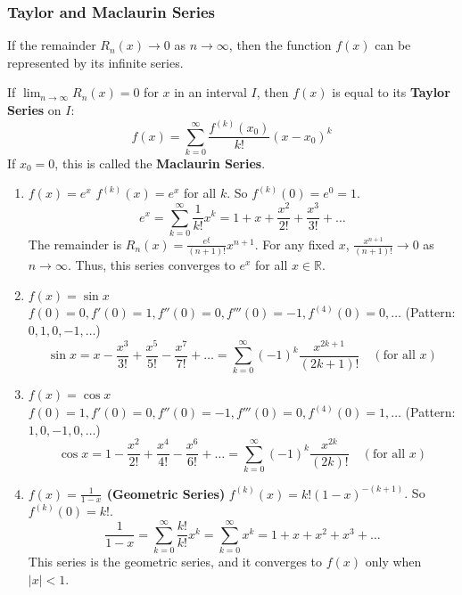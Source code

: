 \subsubsection{Taylor and Maclaurin Series}
If the remainder $R_n(x) \to 0$ as $n \to \infty$, then the function $f(x)$ can be represented by its infinite series.

\begin{definition}
If $\lim_{n \to \infty} R_n(x) = 0$ for $x$ in an interval $I$, then $f(x)$ is equal to its \textbf{Taylor Series} on $I$:
\[
f(x) = \sum_{k=0}^{\infty} \frac{f^{(k)}(x_0)}{k!} (x-x_0)^k
\]
If $x_0 = 0$, this is called the \textbf{Maclaurin Series}.
\end{definition}

\begin{example}
\begin{enumerate}
    \item \textbf{$f(x) = e^x$}
    $f^{(k)}(x) = e^x$ for all $k$. So $f^{(k)}(0) = e^0 = 1$.
    \[
    e^x = \sum_{k=0}^{\infty} \frac{1}{k!} x^k = 1 + x + \frac{x^2}{2!} + \frac{x^3}{3!} + \dots
    \]
    The remainder is $R_n(x) = \frac{e^\xi}{(n+1)!} x^{n+1}$. For any fixed $x$, $\frac{x^{n+1}}{(n+1)!} \to 0$ as $n \to \infty$. Thus, this series converges to $e^x$ for all $x \in \mathbb{R}$.

    \item \textbf{$f(x) = \sin x$}
    $f(0)=0, f'(0)=1, f''(0)=0, f'''(0)=-1, f^{(4)}(0)=0, \dots$ (Pattern: $0, 1, 0, -1, \dots$)
    \[
    \sin x = x - \frac{x^3}{3!} + \frac{x^5}{5!} - \frac{x^7}{7!} + \dots = \sum_{k=0}^{\infty} (-1)^k \frac{x^{2k+1}}{(2k+1)!} \quad (\text{for all } x)
    \]

    \item \textbf{$f(x) = \cos x$}
    $f(0)=1, f'(0)=0, f''(0)=-1, f'''(0)=0, f^{(4)}(0)=1, \dots$ (Pattern: $1, 0, -1, 0, \dots$)
    \[
    \cos x = 1 - \frac{x^2}{2!} + \frac{x^4}{4!} - \frac{x^6}{6!} + \dots = \sum_{k=0}^{\infty} (-1)^k \frac{x^{2k}}{(2k)!} \quad (\text{for all } x)
    \]
    
    \item \textbf{$f(x) = \frac{1}{1-x}$ (Geometric Series)}
    $f^{(k)}(x) = k! (1-x)^{-(k+1)}$. So $f^{(k)}(0) = k!$.
    \[
    \frac{1}{1-x} = \sum_{k=0}^{\infty} \frac{k!}{k!} x^k = \sum_{k=0}^{\infty} x^k = 1 + x + x^2 + x^3 + \dots
    \]
    This series is the geometric series, and it converges to $f(x)$ only when $|x| < 1$.
\end{enumerate}
\end{example}

